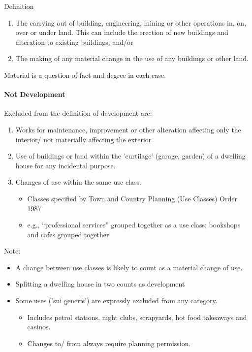 \documentclass[
]{article}
\providecommand{\tightlist}{%
  \setlength{\itemsep}{0pt}\setlength{\parskip}{0pt}}
\newenvironment{env-615494ee-4c11-425d-a24a-676608cc22a4}
{
    \savenotes\tcolorbox[blanker,breakable,left=5pt,borderline west={2pt}{-4pt}{gold}]
}
{
    \endtcolorbox\spewnotes
}
\begin{document}
\begin{env-615494ee-4c11-425d-a24a-676608cc22a4}

Definition

\begin{enumerate}
\tightlist
\item
  The carrying out of building, engineering, mining or other operations
  in, on, over or under land. This can include the erection of new
  buildings and alteration to existing buildings; and/or
\item
  The making of any material change in the use of any buildings or other
  land.
\end{enumerate}

\end{env-615494ee-4c11-425d-a24a-676608cc22a4}

Material is a question of fact and degree in each case.

\hypertarget{not-development}{%
\paragraph{Not Development}\label{not-development}}

Excluded from the definition of development are:

\begin{enumerate}
\tightlist
\item
  Works for maintenance, improvement or other alteration affecting only
  the interior/ not materially affecting the exterior
\item
  Use of buildings or land within the 'curtilage' (garage, garden) of a
  dwelling house for any incidental purpose.
\item
  Changes of use within the same use class.

  \begin{itemize}
  \tightlist
  \item
    Classes specified by Town and Country Planning (Use Classes) Order
    1987
  \item
    e.g., ``professional services'' grouped together as a use class;
    bookshops and cafes grouped together.
  \end{itemize}
\end{enumerate}

Note:

\begin{itemize}
\tightlist
\item
  A change between use classes is likely to count as a material change
  of use.
\item
  Splitting a dwelling house in two counts as development
\item
  Some uses ('sui generis') are expressly excluded from any category.

  \begin{itemize}
  \tightlist
  \item
    Includes petrol stations, night clubs, scrapyards, hot food
    takeaways and casinos.
  \item
    Changes to/ from always require planning permission.
  \end{itemize}
\end{itemize}
\end{document}
